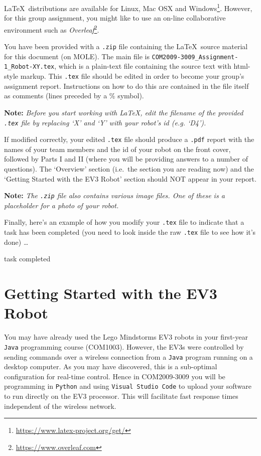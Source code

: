 \documentclass[hidelinks,a4paper,11pt]{article}
\newcommand{\cmark}{\ding{51}}%
\newcommand{\done}{\rlap{$\square$}{\raisebox{2pt}{\large\hspace{1pt}\cmark}}
\hspace{-2.5pt}}
\newcounter{question}
\begin{document}
\LaTeX\ distributions are available for Linux, Mac OSX and Windows\footnote{\url{https://www.latex-project.org/get/}}.  However, for this group assignment, you might like to use an on-line collaborative environment such as \emph{Overleaf}\footnote{\url{https://www.overleaf.com}}.

You have been provided with a \texttt{.zip} file containing the \LaTeX\ source material for this document (on MOLE).  The main file is \texttt{COM2009-3009\_Assignment-1\_Robot-XY.tex}, which is a plain-text file containing the source text with html-style markup.  This \texttt{.tex} file should be edited in order to become your group's assignment report.  Instructions on how to do this are contained in the file itself as comments (lines preceded by a \% symbol).  

{\bfseries Note:}  \emph{Before you start working with \emph{\LaTeX}, edit the filename of the provided \texttt{.tex} file by replacing `X' and `Y' with your robot's id (e.g. `D4').}

 
If modified correctly, your edited \texttt{.tex} file should produce a \texttt{.pdf} report with the names of your team members and the id of your robot on the front cover, followed by Parts I and II (where you will be providing answers to a number of questions).  The `Overview' section (i.e.\ the section you are reading now) and the `Getting Started with the EV3 Robot' section should NOT appear in your report.  

{\bfseries Note:}  \emph{The \texttt{.zip} file also contains various image files.  One of these is a placeholder for a photo of your robot.}

Finally, here's an example of how you modify your \texttt{.tex} file to indicate that a task has been completed (you need to look inside the raw \texttt{.tex} file to see how it's done) \ldots
\begin{todolist}
	\item[\done] task completed
 \end{todolist}


\newpage


\section{Getting Started with the EV3 Robot}

You may have already used the Lego Mindstorms EV3 robots in your first-year \texttt{Java} programming course (COM1003).  However, the EV3s were controlled by sending commands over a wireless connection from a \texttt{Java} program running on a desktop computer.  As you may have discovered, this is a sub-optimal configuration for real-time control.  Hence in COM2009-3009 you will be programming in \texttt{Python} and using \texttt{Visual Studio Code} to upload your software to run directly on the EV3 processor.  This will facilitate fast response times independent of the wireless network.
\end{document}
